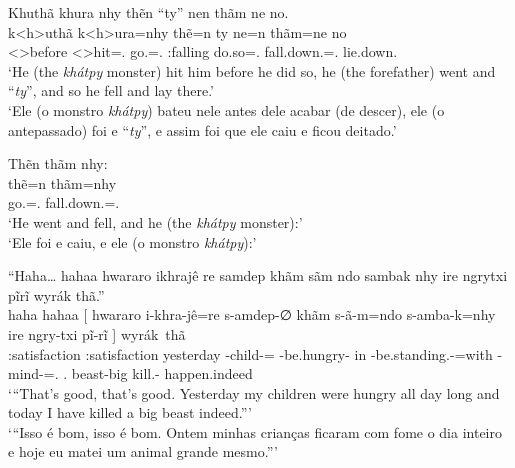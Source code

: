 \documentclass[output=paper,
modfonts,nonflat
]{langsci/langscibook}
\begin{document}
\ea  Khuthã khura nhy thẽn ``ty'' nen thãm ne no. \\[.3em]
\gll k<h>uthã       k<h>ura=nhy            thẽ=n             ty            ne=n             thãm=ne                    no             \\
     <\Third>before <\Third>hit=\AAnd.\Ds{} go.\Sg=\AAnd.\Ss{} \Ontp:falling do.so=\AAnd.\Ss{} fall.down.\Sg{}=\AAnd.\Ss{} lie.down.\Sg{} \\
\glt `He (the \textit{khátpy} monster) hit him before he did so, he (the forefather) went and ``\textit{ty}'', and so he fell and lay there.' \\
     `Ele (o monstro \textit{khátpy}) bateu nele antes dele acabar (de descer), ele (o antepassado) foi e ``\textit{ty}'', e assim foi que ele caiu e ficou deitado.' \\
\z

\ea  Thẽn thãm nhy: \\[.3em]
\gll thẽ=n             thãm=nhy                   \\
     go.\Sg=\AAnd.\Ss{} fall.down.\Sg{}=\AAnd.\Ds{} \\
\glt `He went and fell, and he (the \textit{khátpy} monster):' \\
     `Ele foi e caiu, e ele (o monstro \textit{khátpy}):' \\
\z

\ea  ``Haha\ldots{} hahaa hwararo ikhrajê re samdep khãm sãm ndo sambak nhy ire ngrytxi pĩrĩ wyrák thã.'' \\[.3em]
\gll haha               hahaa              [  hwararo   i-khra-jê=re              s-amdep-∅                khãm s-ã-m=ndo                           s-amba-k=nhy                   ire           ngry-txi  pĩ-rĩ                         ]  wyrák\ thã    \\
     \Intj:satisfaction \Intj:satisfaction {} yesterday \First-child-\Pl{}=\Erg{} \Third-be.hungry-\Nmlz{} in   \Third-be.standing.\Sg-\Nmlz{}=with \Third-mind-\Nmlz{}=\AAnd.\Ds{} \First.\Erg{} beast-big kill.\Sg\footnotemark-\Nmlz{} {} happen.indeed \\
\glt `{}``That's good, that's good. Yesterday my children were hungry all day long and today I have killed a big beast indeed.''{}' \\
     `{}``Isso é bom, isso é bom. Ontem minhas crianças ficaram com fome o dia inteiro e hoje eu matei um animal grande mesmo.''{}' \\
\z
\end{document}
